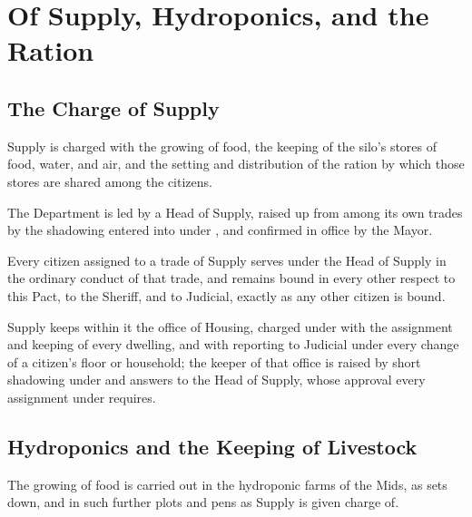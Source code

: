 \chapter{Of Supply, Hydroponics, and the Ration}
\label{art:supply}


\section{The Charge of Supply}
\label{sec:supply:charge-of-supply}

Supply is charged with the growing of food, the keeping of the silo's stores of food, water, and air, and the setting and distribution of the ration by which those stores are shared among the citizens.

\begin{clauses}
\item The Department is led by a Head of Supply, raised up from among its own trades by the shadowing entered into under , and confirmed in office by the Mayor.
\item Every citizen assigned to a trade of Supply serves under the Head of Supply in the ordinary conduct of that trade, and remains bound in every other respect to this Pact, to the Sheriff, and to Judicial, exactly as any other citizen is bound.
\item Supply keeps within it the office of Housing, charged under  with the assignment and keeping of every dwelling, and with reporting to Judicial under  every change of a citizen's floor or household; the keeper of that office is raised by short shadowing under  and answers to the Head of Supply, whose approval every assignment under  requires.
\end{clauses}

\section{Hydroponics and the Keeping of Livestock}
\label{sec:supply:hydroponics-and-the-keeping-of-livestock}

The growing of food is carried out in the hydroponic farms of the Mids, as  sets down, and in such further plots and pens as Supply is given charge of.

